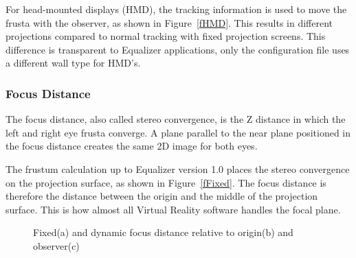 \documentclass[10pt,a4]{scrartcl}
\newcommand{\fig}[1]{Figure~\ref{#1}}
\begin{document}
For head-mounted displays (HMD), the tracking information is used to move the
frusta with the observer, as shown in \fig{fHMD}. This results in different
projections compared to normal tracking with fixed projection screens. This
difference is transparent to Equalizer applications, only the configuration file
uses a different wall type for HMD's.

\subsubsection{\label{sFocusDistance}Focus Distance}

The focus distance, also called stereo convergence, is the Z distance in which
the left and right eye frusta converge. A plane parallel to the near plane
positioned in the focus distance creates the same 2D image for both eyes.

The frustum calculation up to Equalizer version 1.0 places the stereo
convergence on the projection surface, as shown in \fig{fFixed}. The focus
distance is therefore the distance between the origin and the middle of the
projection surface. This is how almost all Virtual Reality software handles the
focal plane.

\begin{figure}[h!t]\center
  \hfil
  \hfil
  {\caption{Fixed(a) and dynamic focus distance relative to origin(b) and observer(c)}}
\end{figure}
\end{document}
